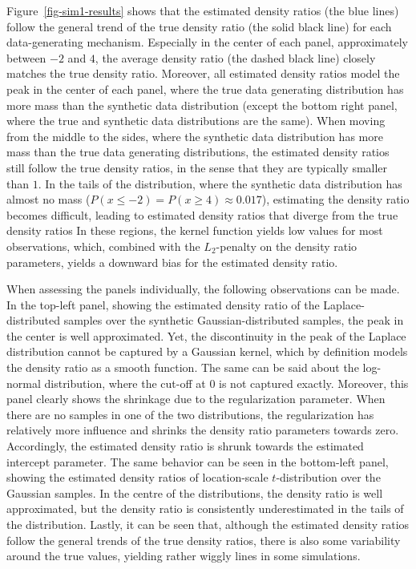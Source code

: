 \documentclass[
]{article}
\begin{document}
\linespread{2}

Figure~\ref{fig-sim1-results} shows that the estimated density ratios
(the blue lines) follow the general trend of the true density ratio (the
solid black line) for each data-generating mechanism. Especially in the
center of each panel, approximately between \(-2\) and \(4\), the
average density ratio (the dashed black line) closely matches the true
density ratio. Moreover, all estimated density ratios model the peak in
the center of each panel, where the true data generating distribution
has more mass than the synthetic data distribution (except the bottom
right panel, where the true and synthetic data distributions are the
same). When moving from the middle to the sides, where the synthetic
data distribution has more mass than the true data generating
distributions, the estimated density ratios still follow the true
density ratios, in the sense that they are typically smaller than \(1\).
In the tails of the distribution, where the synthetic data distribution
has almost no mass (\(P(x \leq -2) = P(x \geq 4) \approx 0.017\)),
estimating the density ratio becomes difficult, leading to estimated
density ratios that diverge from the true density ratios In these
regions, the kernel function yields low values for most observations,
which, combined with the \(L_2\)-penalty on the density ratio
parameters, yields a downward bias for the estimated density ratio.

When assessing the panels individually, the following observations can
be made. In the top-left panel, showing the estimated density ratio of
the Laplace-distributed samples over the synthetic Gaussian-distributed
samples, the peak in the center is well approximated. Yet, the
discontinuity in the peak of the Laplace distribution cannot be captured
by a Gaussian kernel, which by definition models the density ratio as a
smooth function. The same can be said about the log-normal distribution,
where the cut-off at \(0\) is not captured exactly. Moreover, this panel
clearly shows the shrinkage due to the regularization parameter. When
there are no samples in one of the two distributions, the regularization
has relatively more influence and shrinks the density ratio parameters
towards zero. Accordingly, the estimated density ratio is shrunk towards
the estimated intercept parameter. The same behavior can be seen in the
bottom-left panel, showing the estimated density ratios of
location-scale \(t\)-distribution over the Gaussian samples. In the
centre of the distributions, the density ratio is well approximated, but
the density ratio is consistently underestimated in the tails of the
distribution. Lastly, it can be seen that, although the estimated
density ratios follow the general trends of the true density ratios,
there is also some variability around the true values, yielding rather
wiggly lines in some simulations.
\end{document}
